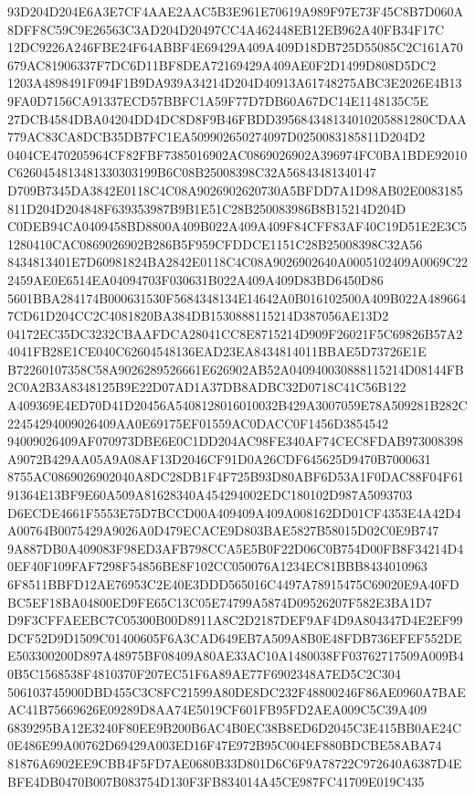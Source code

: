 \documentclass[UTF8,fontset=fandol,zihao=-4,a4paper]{ctexart}
\begin{document}
{{93D204D204E6A3E7CF4AAE2AAC5B3E961E70619A989F97E73F45C8B7D060A8DFF8C59C9E26563C3AD204D20497CC4A462448EB12EB962A40FB34F17C
12DC9226A246FBE24F64ABBF4E69429A409A409D18DB725D55085C2C161A70679AC81906337F7DC6D11BF8DEA72169429A409AE0F2D1499D808D5DC2
1203A4898491F094F1B9DA939A34214D204D40913A61748275ABC3E2026E4B139FA0D7156CA91337ECD57BBFC1A59F77D7DB60A67DC14E1148135C5E
27DCB4584DBA04204DD4DC8D8F9B46FBDD395684348134010205881280CDAA779AC83CA8DCB35DB7FC1EA509902650274097D0250083185811D204D2
0404CE470205964CF82FBF7385016902AC0869026902A396974FC0BA1BDE92010C6260454813481330303199B6C08B25008398C32A56843481340147
D709B7345DA3842E0118C4C08A9026902620730A5BFDD7A1D98AB02E0083185811D204D204848F639353987B9B1E51C28B250083986B8B15214D204D
C0DEB94CA0409458BD8800A409B022A409A409F84CFF83AF40C19D51E2E3C51280410CAC0869026902B286B5F959CFDDCE1151C28B25008398C32A56
8434813401E7D60981824BA2842E0118C4C08A9026902640A0005102409A0069C222459AE0E6514EA04094703F030631B022A409A409D83BD6450D86
5601BBA284174B000631530F5684348134E14642A0B016102500A409B022A4896647CD61D204CC2C4081820BA384DB1530888115214D387056AE13D2
04172EC35DC3232CBAAFDCA28041CC8E8715214D909F26021F5C69826B57A24041FB28E1CE040C62604548136EAD23EA8434814011BBAE5D73726E1E
B72260107358C58A9026289526661E626902AB52A040940030888115214D08144FB2C0A2B3A8348125B9E22D07AD1A37DB8ADBC32D0718C41C56B122
A409369E4ED70D41D20456A5408128016010032B429A3007059E78A509281B282C22454294009026409AA0E69175EF01559AC0DACC0F1456D3854542
94009026409AF070973DBE6E0C1DD204AC98FE340AF74CEC8FDAB973008398A9072B429AA05A9A08AF13D2046CF91D0A26CDF645625D9470B7000631
8755AC0869026902040A8DC28DB1F4F725B93D80ABF6D53A1F0DAC88F04F6191364E13BF9E60A509A81628340A454294002EDC180102D987A5093703
D6ECDE4661F5553E75D7BCCD00A409409A409A008162DD01CF4353E4A42D4A00764B0075429A9026A0D479ECACE9D803BAE5827B58015D02C0E9B747
9A887DB0A409083F98ED3AFB798CCA5E5B0F22D06C0B754D00FB8F34214D40EF40F109FAF7298F54856BE8F102CC050076A1234EC81BBB8434010963
6F8511BBFD12AE76953C2E40E3DDD565016C4497A78915475C69020E9A40FDBC5EF18BA04800ED9FE65C13C05E74799A5874D09526207F582E3BA1D7
D9F3CFFAEEBC7C05300B00D8911A8C2D2187DEF9AF4D9A804347D4E2EF99DCF52D9D1509C01400605F6A3CAD649EB7A509A8B0E48FDB736EFEF552DE
E503300200D897A48975BF08409A80AE33AC10A1480038FF03762717509A009B40B5C1568538F4810370F207EC51F6A89AE77F6902348A7ED5C2C304
506103745900DBD455C3C8FC21599A80DE8DC232F48800246F86AE0960A7BAEAC41B75669626E09289D8AA74E5019CF601FB95FD2AEA009C5C39A409
6839295BA12E3240F80EE9B200B6AC4B0EC38B8ED6D2045C3E415BB0AE24C0E486E99A00762D69429A003ED16F47E972B95C004EF880BDCBE58ABA74
81876A6902EE9CBB4F5FD7AE0680B33D801D6C6F9A78722C972640A6387D4EBFE4DB0470B007B083754D130F3FB834014A45CE987FC41709E019C435
}}
\end{document}
